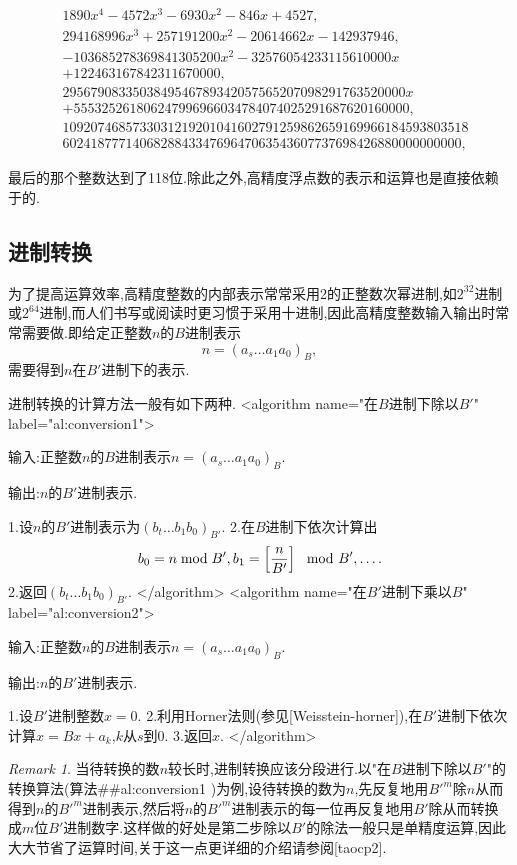 \documentclass{ctexart}
\newcommand\mtcasCite[1]{[#1]}
\theoremstyle{remark}
\newtheorem{remark}{Remark}
\theoremstyle{definition}
\begin{document}
\begin{align*}
&1890x^4-4572x^3-6930x^2-846x+4527,\\
&294168996x^3+257191200x^2-20614662x-142937946,\\
&-103685278369841305200x^2-32576054233115610000x\\
&+122463167842311670000,\\
&2956790833503849546789342057565207098291763520000x\\
&+555325261806247996966034784074025291687620160000,\\
&1092074685733031219201041602791259862659169966184593803518\\
&602418777140682884334769647063543607737698426880000000000,
\end{align*}

最后的那个整数达到了118位.除此之外,高精度浮点数的表示和运算也是直接依赖于的.

\subsection{进制转换}

为了提高运算效率,高精度整数的内部表示常常采用2的正整数次幂进制,如$2^{32}$进制或$2^{64}$进制,而人们书写或阅读时更习惯于采用十进制,因此高精度整数输入输出时常常需要做.即给定正整数$n$的$B$进制表示$$n=(a_s\ldots a_1a_0)_B,$$需要得到$n$在$B'$进制下的表示.

进制转换的计算方法一般有如下两种.
<algorithm  name="在$B$进制下除以$B'$" label="al:conversion1">

输入:正整数$n$的$B$进制表示$n=(a_s\ldots a_1a_0)_B$.

输出:$n$的$B'$进制表示.

 1.设$n$的$B'$进制表示为$(b_t \ldots b_1b_0)_{B'}$.
 2.在$B$进制下依次计算出$$b_0=n\bmod B',b_1=\left[{n\over B'}\right]\mod B',\ldots.$$
 2.返回$(b_t\ldots b_1b_0)_{B'}$.
</algorithm>
<algorithm name="在$B'$进制下乘以$B$" label="al:conversion2">

输入:正整数$n$的$B$进制表示$n=(a_s\ldots a_1a_0)_B$.

输出:$n$的$B'$进制表示.

 1.设$B'$进制整数$x=0$.
 2.利用Horner法则(参见\mtcasCite{Weisstein-horner}),在$B'$进制下依次计算$x=Bx+a_k$,$k$从$s$到0.
 3.返回$x$.
</algorithm>
\begin{remark}
当待转换的数$n$较长时,进制转换应该分段进行.以"在$B$进制下除以$B'$"的转换算法(算法##al:conversion1
)为例,设待转换的数为$n$,先反复地用$B'^m$除$n$从而得到$n$的$B'^m$进制表示,然后将$n$的$B'^m$进制表示的每一位再反复地用$B'$除从而转换成$m$位$B'$进制数字.这样做的好处是第二步除以$B'$的除法一般只是单精度运算,因此大大节省了运算时间,关于这一点更详细的介绍请参阅\mtcasCite{taocp2}.
\end{remark}
\end{document}
